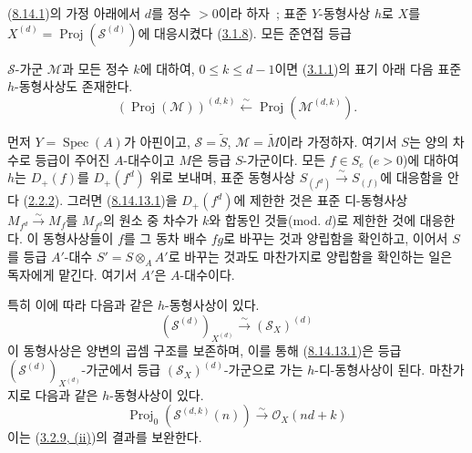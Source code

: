 \begin{remark}[8.14.13]
\label{II.8.14.13-ko}
(\hyperref[II.8.14.1-ko]{8.14.1})의 가정 아래에서 $d$를 정수
$>0$이라 하자~; 표준 $Y$-동형사상 $h$로 $X$를
$X^{(d)}=\operatorname{Proj}(\mathcal{S}^{(d)})$에 대응시켰다
(\hyperref[II.3.1.8-ko]{3.1.8}). 모든 준연접 등급

$\mathcal{S}$-가군 $\mathcal{M}$과 모든 정수 $k$에 대하여,
$0\leqslant k\leqslant d-1$이면
(\hyperref[II.3.1.1-ko]{3.1.1})의 표기 아래 다음 표준
$h$-동형사상도 존재한다.
\begin{equation}
\label{II.8.14.13.1-ko}
  (\operatorname{Proj}(\mathcal{M}))^{(d,k)}
  \xleftarrow{\sim}\operatorname{Proj}(\mathcal{M}^{(d,k)}).
\tag{8.14.13.1}
\end{equation}

먼저 $Y=\operatorname{Spec}(A)$가 아핀이고,
$\mathcal{S}=\widetilde{S}$, $\mathcal{M}=\widetilde{M}$이라 가정하자.
여기서 $S$는 양의 차수로 등급이 주어진 $A$-대수이고 $M$은 등급
$S$-가군이다. 모든 $f\in S_e$ ($e>0$)에 대하여 $h$는 $D_+(f)$를
$D_+(f^d)$ 위로 보내며, 표준 동형사상
$S_{(f^d)}\xrightarrow{\sim}S_{(f)}$에 대응함을 안다
(\hyperref[II.2.2.2-ko]{2.2.2}). 그러면
(\hyperref[II.8.14.13.1-ko]{8.14.13.1})을 $D_+(f^d)$에 제한한 것은
표준 디-동형사상 $M_{f^d}\xrightarrow{\sim}M_f$를 $M_{f^d}$의 원소
중 차수가 $k$와 합동인 것들(mod. $d$)로 제한한 것에 대응한다. 이
동형사상들이 $f$를 그 동차 배수 $fg$로 바꾸는 것과 양립함을
확인하고, 이어서 $S$를 등급 $A'$-대수 $S'=S\otimes_A A'$로 바꾸는
것과도 마찬가지로 양립함을 확인하는 일은 독자에게 맡긴다. 여기서
$A'$은 $A$-대수이다.

특히 이에 따라 다음과 같은 $h$-동형사상이 있다.
\begin{equation}
\label{II.8.14.13.2-ko}
  (\mathcal{S}^{(d)})_{X^{(d)}}
  \xrightarrow{\sim}(\mathcal{S}_X)^{(d)}
\tag{8.14.13.2}
\end{equation}
이 동형사상은 양변의 곱셈 구조를 보존하며, 이를 통해
(\hyperref[II.8.14.13.1-ko]{8.14.13.1})은 등급
$(\mathcal{S}^{(d)})_{X^{(d)}}$-가군에서 등급
$(\mathcal{S}_X)^{(d)}$-가군으로 가는 $h$-디-동형사상이 된다.
마찬가지로 다음과 같은 $h$-동형사상이 있다.
\begin{equation}
\label{II.8.14.13.3-ko}
  \operatorname{Proj}_0(\mathcal{S}^{(d,k)}(n))
  \xrightarrow{\sim}\mathcal{O}_X(nd+k)
\tag{8.14.13.3}
\end{equation}
이는 (\hyperref[II.3.2.9-ko]{3.2.9, (ii)})의 결과를 보완한다.


\end{remark}
